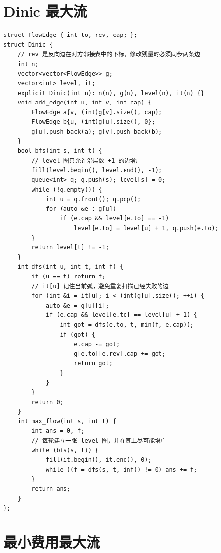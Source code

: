 \section{Dinic 最大流}


\begin{lstlisting}[style=cpp]
struct FlowEdge { int to, rev, cap; };
struct Dinic {
    // rev 是反向边在对方邻接表中的下标，修改残量时必须同步两条边
    int n;
    vector<vector<FlowEdge>> g;
    vector<int> level, it;
    explicit Dinic(int n): n(n), g(n), level(n), it(n) {}
    void add_edge(int u, int v, int cap) {
        FlowEdge a{v, (int)g[v].size(), cap};
        FlowEdge b{u, (int)g[u].size(), 0};
        g[u].push_back(a); g[v].push_back(b);
    }
    bool bfs(int s, int t) {
        // level 图只允许沿层数 +1 的边增广
        fill(level.begin(), level.end(), -1);
        queue<int> q; q.push(s); level[s] = 0;
        while (!q.empty()) {
            int u = q.front(); q.pop();
            for (auto &e : g[u])
                if (e.cap && level[e.to] == -1)
                    level[e.to] = level[u] + 1, q.push(e.to);
        }
        return level[t] != -1;
    }
    int dfs(int u, int t, int f) {
        if (u == t) return f;
        // it[u] 记住当前弧，避免重复扫描已经失败的边
        for (int &i = it[u]; i < (int)g[u].size(); ++i) {
            auto &e = g[u][i];
            if (e.cap && level[e.to] == level[u] + 1) {
                int got = dfs(e.to, t, min(f, e.cap));
                if (got) {
                    e.cap -= got;
                    g[e.to][e.rev].cap += got;
                    return got;
                }
            }
        }
        return 0;
    }
    int max_flow(int s, int t) {
        int ans = 0, f;
        // 每轮建立一张 level 图，并在其上尽可能增广
        while (bfs(s, t)) {
            fill(it.begin(), it.end(), 0);
            while ((f = dfs(s, t, inf)) != 0) ans += f;
        }
        return ans;
    }
};
\end{lstlisting}

\section{最小费用最大流}


